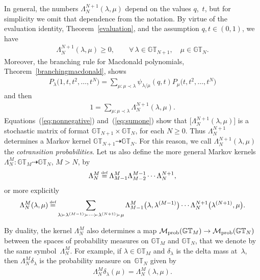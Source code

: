 \documentclass[pdftex]{sigma}
\numberwithin{equation}{section}
\newcommand\myeq{\mathrel{\stackrel{\makebox[0pt]{\mbox{\normalfont\tiny def}}}{=}}}
\newcommand{\GT}{\mathbb{GT}}
\begin{document}
In general, the numbers $\Lambda^{N+1}_N(\lambda, \mu)$ depend on the values $q$,~$t$, but for simplicity we omit that dependence from the notation. By virtue of the evaluation identity, Theorem~\ref{evaluation}, and the assumption $q, t\in (0, 1)$, we have
\begin{gather}\label{eq:nonnegative}
\Lambda^{N+1}_N(\lambda, \mu) \geq 0, \qquad \forall\, \lambda\in\GT_{N+1},\quad \mu\in\GT_N.
\end{gather}
Moreover, the branching rule for Macdonald polynomials, Theorem~\ref{branchingmacdonald}, shows
\begin{gather*}
P_{\lambda}\big(1, t, t^2, \dots, t^N\big) = \sum_{\mu\colon \mu\prec\lambda}{\psi_{\lambda/\mu}(q, t)P_{\mu}\big(t, t^2, \dots, t^N\big)}
\end{gather*}
and then
\begin{gather}\label{eq:sumone}
1 = \sum_{\mu\colon \mu\prec\lambda}{\Lambda^{N+1}_N(\lambda, \mu)}.
\end{gather}
Equations~(\ref{eq:nonnegative}) and~(\ref{eq:sumone}) show that $\big[\Lambda^{N+1}_N(\lambda, \mu)\big]$ is a stochastic matrix of format $\GT_{N+1}\times\GT_N$, for each $N\geq 0$. Thus $\Lambda^{N+1}_N$ determines a Markov kernel $\GT_{N+1} \dashrightarrow \GT_N$. For this reason, we call $\Lambda^{N+1}_N(\lambda, \mu)$ the \textit{cotransition probabilities}. Let us also def\/ine the more general Markov kernels $\Lambda^M_N\colon \GT_M \dashrightarrow \GT_N$, $M > N$, by
\begin{gather*}
\Lambda^M_N \myeq \Lambda^M_{M-1}\Lambda^{M-1}_{M-2}\cdots\Lambda^{N+1}_N,
\end{gather*}
or more explicitly
\begin{gather*}
\Lambda^M_N(\lambda, \mu) \myeq \sum_{\lambda \succ \lambda^{(M-1)} \succ \cdots \succ \lambda^{(N+1)} \succ \mu}{\Lambda^M_{M-1}\big(\lambda, \lambda^{(M-1)}\big)\cdots \Lambda^{N+1}_N\big(\lambda^{(N+1)}, \mu\big)}.
\end{gather*}

By duality, the kernel $\Lambda^M_N$ also determines a map $\mathcal{M}_{\rm prob}(\GT_M) \rightarrow \mathcal{M}_{\rm prob}(\GT_N)$ between the spaces of probability measures on $\GT_M$ and $\GT_N$, that we denote by the same symbol~$\Lambda^M_N$. For example, if $\lambda\in\GT_M$ and $\delta_{\lambda}$ is the delta mass at~$\lambda$, then $\Lambda^M_N\delta_{\lambda}$ is the probability measure on~$\GT_N$ given by
\begin{gather}\label{kernelsmeasures}
\Lambda^M_N\delta_{\lambda} ( \mu ) = \Lambda^M_N(\lambda, \mu).
\end{gather}
\end{document}
